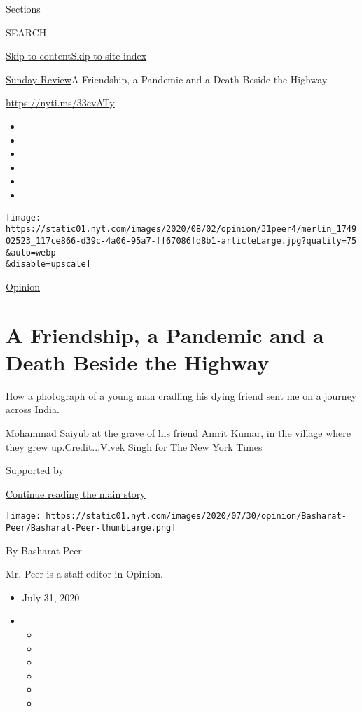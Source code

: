 Sections

SEARCH

\protect\hyperlink{site-content}{Skip to
content}\protect\hyperlink{site-index}{Skip to site index}

\href{/section/opinion/sunday}{Sunday Review}\textbar{}A Friendship, a
Pandemic and a Death Beside the Highway

\href{https://nyti.ms/33cvATy}{https://nyti.ms/33cvATy}

\begin{itemize}
\item
\item
\item
\item
\item
\item
\end{itemize}

\texttt{[image: https://static01.nyt.com/images/2020/08/02/opinion/31peer4/merlin\_174902523\_117ce866-d39c-4a06-95a7-ff67086fd8b1-articleLarge.jpg?quality=75\\\&auto=webp\\\&disable=upscale]}

\href{/section/opinion}{Opinion}

\hypertarget{a-friendship-a-pandemic-and-a-death-beside-the-highway}{%
\section{A Friendship, a Pandemic and a Death Beside the
Highway}\label{a-friendship-a-pandemic-and-a-death-beside-the-highway}}

How a photograph of a young man cradling his dying friend sent me on a
journey across India.

Mohammad Saiyub at the grave of his friend Amrit Kumar, in the village
where they grew up.Credit...Vivek Singh for The New York Times

Supported by

\protect\hyperlink{after-sponsor}{Continue reading the main story}

\texttt{[image: https://static01.nyt.com/images/2020/07/30/opinion/Basharat-Peer/Basharat-Peer-thumbLarge.png]}

By Basharat Peer

Mr. Peer is a staff editor in Opinion.

\begin{itemize}
\item
  July 31, 2020
\item
  \begin{itemize}
  \item
  \item
  \item
  \item
  \item
  \item
  \end{itemize}
\end{itemize}

